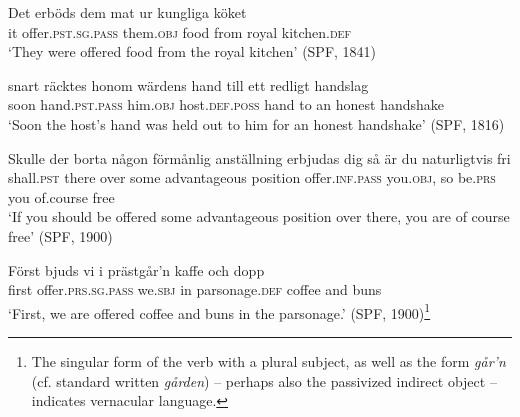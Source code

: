 \documentclass[output=paper]{langscibook}
\begin{document}
\ex\label{ex:falk:20c}
\gll Det  erböds          dem        mat    ur    kungliga    köket\\
      it      offer.\textsc{pst.sg.pass}    them.\textsc{obj}  food  from  royal      kitchen.\textsc{def}\\
\glt ‘They were offered food from the royal kitchen’ (SPF, 1841)

\ex\label{ex:falk:20d}
\gll snart  räcktes        honom    wärdens        hand  till   ett  redligt  handslag\\
      soon  hand\textsc{.pst.pass}  him\textsc{.obj}  host.\textsc{def.poss}   hand  to   an  honest   handshake\\
\glt ‘Soon the host’s hand was held out to him for an honest handshake’ (SPF, 1816)

\ex\label{ex:falk:20e}
\gll Skulle      der  borta  någon  förmånlig    anställning  erbjudas dig         så   är      du    naturligtvis    fri\\
shall.\textsc{pst}     there  over  some    advantageous  position     offer\textsc{.inf}.\textsc{pass}      you\textsc{.obj},   so  be.\textsc{prs}  you  of.course      free\\
\glt ‘If you should be offered some advantageous position over there, you are of         course free’ (SPF, 1900)

\ex\label{ex:falk:20f}
\gll Först  bjuds            vi      i  prästgår’n      kaffe    och  dopp\\
      first  offer\textsc{.prs}.\textsc{sg.pass}    we.\textsc{sbj}  in  parsonage\textsc{.def}  coffee  and  buns\\
\glt ‘First, we are offered coffee and buns in the parsonage.’ (SPF, 1900)\footnote{The singular form of the verb with a plural subject, as well as the form \textit{går’n} (cf. standard written \textit{gården}) – perhaps also the passivized indirect object – indicates vernacular language.}
\z
\z
\end{document}
